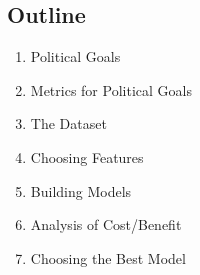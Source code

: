 
\subsection{Outline}

\begin{enumerate}
	\item Political Goals
	\item Metrics for Political Goals
	\item The Dataset
	\item Choosing Features
	\item Building Models
	\item Analysis of Cost/Benefit
	\item Choosing the Best Model
\end{enumerate}